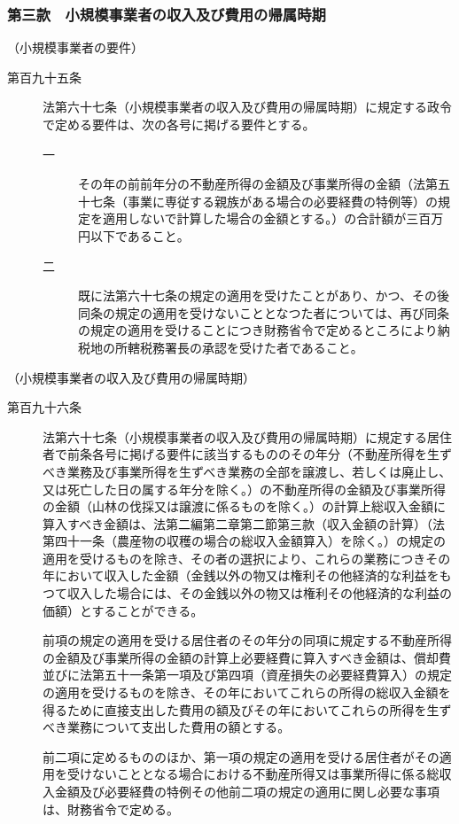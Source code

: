 \documentclass[twocolumn,a4j,10pt]{ltjtarticle}
\begin{document}
\subsubsection*{第三款　小規模事業者の収入及び費用の帰属時期}
\noindent\hspace{10pt}（小規模事業者の要件）
\begin{description}
\item[第百九十五条]法第六十七条（小規模事業者の収入及び費用の帰属時期）に規定する政令で定める要件は、次の各号に掲げる要件とする。
\begin{description}
\item[一]その年の前前年分の不動産所得の金額及び事業所得の金額（法第五十七条（事業に専従する親族がある場合の必要経費の特例等）の規定を適用しないで計算した場合の金額とする。）の合計額が三百万円以下であること。
\item[二]既に法第六十七条の規定の適用を受けたことがあり、かつ、その後同条の規定の適用を受けないこととなつた者については、再び同条の規定の適用を受けることにつき財務省令で定めるところにより納税地の所轄税務署長の承認を受けた者であること。
\end{description}
\end{description}
\noindent\hspace{10pt}（小規模事業者の収入及び費用の帰属時期）
\begin{description}
\item[第百九十六条]法第六十七条（小規模事業者の収入及び費用の帰属時期）に規定する居住者で前条各号に掲げる要件に該当するもののその年分（不動産所得を生ずべき業務及び事業所得を生ずべき業務の全部を譲渡し、若しくは廃止し、又は死亡した日の属する年分を除く。）の不動産所得の金額及び事業所得の金額（山林の伐採又は譲渡に係るものを除く。）の計算上総収入金額に算入すべき金額は、法第二編第二章第二節第三款（収入金額の計算）（法第四十一条（農産物の収穫の場合の総収入金額算入）を除く。）の規定の適用を受けるものを除き、その者の選択により、これらの業務につきその年において収入した金額（金銭以外の物又は権利その他経済的な利益をもつて収入した場合には、その金銭以外の物又は権利その他経済的な利益の価額）とすることができる。
\item[]前項の規定の適用を受ける居住者のその年分の同項に規定する不動産所得の金額及び事業所得の金額の計算上必要経費に算入すべき金額は、償却費並びに法第五十一条第一項及び第四項（資産損失の必要経費算入）の規定の適用を受けるものを除き、その年においてこれらの所得の総収入金額を得るために直接支出した費用の額及びその年においてこれらの所得を生ずべき業務について支出した費用の額とする。
\item[]前二項に定めるもののほか、第一項の規定の適用を受ける居住者がその適用を受けないこととなる場合における不動産所得又は事業所得に係る総収入金額及び必要経費の特例その他前二項の規定の適用に関し必要な事項は、財務省令で定める。
\end{description}
\end{document}
